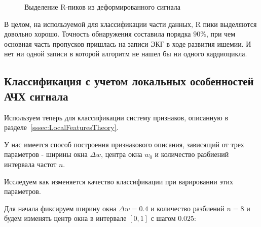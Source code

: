 \documentclass[a4paper,12pt]{extarticle}
\begin{document}
\begin{figure}[H]
  \noindent{}
  \caption{Выделение R-пиков из деформированного сигнала}
\end{figure}

В целом, на используемой для классификации части данных, R пики выделяются довольно хорошо. Точность обнаружения составила порядка $90\%$, при чем основная часть пропусков пришлась на записи ЭКГ в ходе развития ишемии. И нет ни одной записи в которой алгоритм не нашел бы ни одного кардиоцикла.

\subsection{Классификация с учетом локальных особенностей АЧХ сигнала}

Используем теперь для классификации систему признаков, описанную в разделе~\ref{sssec:LocalFeaturesTheory}.

У нас имеется способ построения признакового описания, зависящий от трех параметров - ширины окна $\Delta w$, центра окна $w_0$ и количество разбиений интервала частот $n$.

Исследуем как изменяется качество классификации при варировании этих параметров.

Для начала фиксируем ширину окна $\Delta w = 0.4$ и количество разбиений $n=8$ и будем изменять центр окна в интервале $[0, 1]$ с шагом $0.025$:
\end{document}
